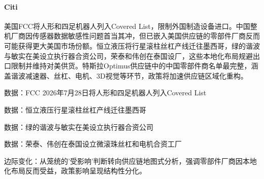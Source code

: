 \documentclass[11pt]{ctexart}
\begin{document}
\paragraph{Citi} 美国FCC将人形和四足机器人列入Covered List，限制外国制造设备进口。中国整机厂商因传感器数据敏感性问题首当其冲，但已嵌入美国供应链的零部件厂商反而可能获得更大美国市场份额。恒立液压将行星滚柱丝杠产线迁往墨西哥，绿的谐波与敏实在美设立执行器合资公司，荣泰和伟创在泰国设厂，这些本地化布局规避出口限制并维持对美供货。特斯拉Optimus供应链中的中国零部件商名单最完整，涵盖谐波减速器、丝杠、电机、3D视觉等环节，政策将加速供应链区域化重构。
{\small\color{refgray}数据：FCC 2026年7月28日将人形和四足机器人列入Covered List\par}
{\small\color{refgray}数据：恒立液压行星滚柱丝杠产线迁往墨西哥\par}
{\small\color{refgray}数据：绿的谐波与敏实在美设立执行器合资公司\par}
{\small\color{refgray}数据：荣泰、伟创在泰国设立微滚珠丝杠和电机合资工厂\par}
{\small\color{refgray}边际变化：从笼统的'受影响'判断转向供应链地图式分析，强调零部件厂商因本地化布局反而受益，政策影响呈现结构性分化。\par}
\end{document}
